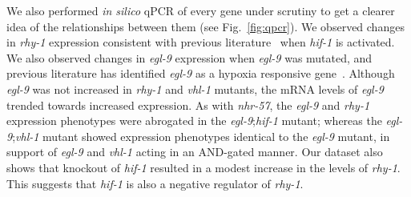 \documentclass[9pt,twocolumn,twoside]{pnas-new}
\newcommand{\egl}{\emph{egl-9}}
\newcommand{\rhy}{\emph{rhy-1}}
\newcommand{\vhl}{\emph{vhl-1}}
\newcommand{\hif}{\emph{hif-1}}
\newcommand{\nhr}{\emph{nhr-57}}
\newcommand{\hifp}{HIF-1}
\begin{document}
We also performed \emph{in silico} qPCR of every gene under scrutiny to get a
clearer idea of the relationships between them (see Fig.~\ref{fig:qpcr}). We
observed changes in \rhy{} expression consistent with previous
literature~\cite{} when \hif{} is activated. We also observed changes in \egl{}
expression when \egl{} was mutated, and previous literature has identified
\egl{} as a hypoxia responsive gene~\cite{}. Although \egl{} was not increased
in \rhy{} and \vhl{} mutants, the mRNA levels of \egl{} trended towards
increased expression.
As with \nhr{}, the \egl{} and \rhy{} expression phenotypes were abrogated in
the \egl{};\hif{} mutant; whereas the \egl{};\vhl{} mutant showed expression
phenotypes identical to the \egl{} mutant, in support of \egl{} and \vhl{}
acting in an AND-gated manner.
Our dataset also shows that knockout of \hif{} resulted in a modest increase in
the levels of \rhy{}. This suggests that \hif{} is also a negative regulator of \rhy{}.

\end{document}
